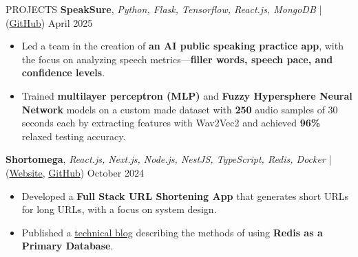 \documentclass{resume} %
\begin{document}
\begin{rSection}{PROJECTS}
     \textbf{SpeakSure}, \textit{Python, Flask, Tensorflow, React.js, MongoDB} | (\href{https://github.com/ninadnaik10/speaksure-web} {GitHub}) \hfill {April 2025}
    \begin{itemize}
        \setlength\itemsep{-0.6em}
        \item  Led a team in the creation of \textbf{an AI public speaking practice app}, with
              the focus on analyzing speech metrics---\textbf{filler words,
                  speech pace, and confidence levels}. 
        \item Trained \textbf{multilayer perceptron (MLP)} and \textbf{Fuzzy Hypersphere Neural Network} models on a custom made dataset with \textbf{250} audio samples of 30 seconds each by extracting features with Wav2Vec2 and achieved \textbf{96\%} relaxed testing accuracy.
    \end{itemize}

  \textbf{Shortomega}, \textit{React.js, Next.js, Node.js, NestJS, TypeScript, Redis, Docker} | (\href{https://shortomega.vercel.app/} {Website}, \href{https://github.com/ninadnaik10/shortomega} {GitHub})  \hfill {October 2024}
    \begin{itemize}
        \setlength\itemsep{-0.6em}
        \item  Developed a \textbf{ Full Stack URL Shortening App} that generates short URLs for long URLs, with a focus on system design.
        \item  Published a \href{https://tech.ninadnaik.me/using-redis-as-a-primary-database}{technical blog} describing the methods of using \textbf{Redis as a Primary Database}.


\end{itemize}
\end{rSection}
\end{document}
